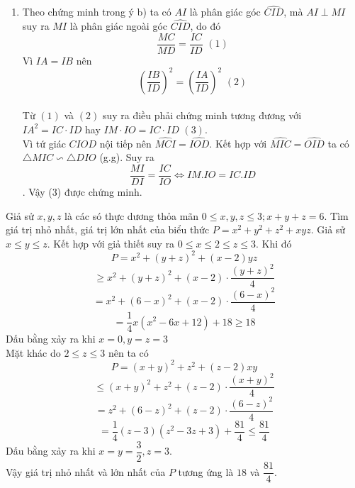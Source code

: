 \begin{ex}
{\begin{enumerate}
        \item Theo chứng minh trong ý b) ta có $AI$ là phân giác góc $\widehat{CID}$, mà $AI \perp MI$ suy ra $MI$ là phân giác ngoài góc $\widehat{CID}$, do đó $$\dfrac{MC}{MD}=\dfrac{IC}{ID} \,\, (1)$$
        Vì $IA=IB$ nên $$\left(\dfrac{IB}{ID}\right)^2=\left(\dfrac{IA}{ID}\right)^2 \,\,(2)$$\\
        Từ $(1)$ và $(2)$ suy ra điều phải chứng minh tương đương với $IA^2=IC \cdot ID$ hay $IM \cdot IO=IC \cdot ID \,\, (3)$.\\
        Vì tứ giác $CIOD$ nội tiếp nên $\widehat{MCI}=\widehat{IOD}$. Kết hợp với $\widehat{MIC}=\widehat{OID}$ ta có $\triangle MIC \backsim \triangle DIO$ (g.g). Suy ra $$\dfrac{MI}{DI}=\dfrac{IC}{IO} \Leftrightarrow IM.IO=IC.ID$$. Vậy (3) được chứng minh.
    \end{enumerate}
    }
\end{ex}

\begin{ex}%
    Giả sử $x,y,z$ là các só thực dương thỏa mãn $0 \le x,y,z \le 3; x+y+z=6$. Tìm giá trị nhỏ nhất, giá trị lớn nhất của biểu thức $P=x^2+y^2+z^2+xyz$.
\loigiai
    { Giả sử $x \leq y \leq z$. Kết hợp với giả thiết suy ra $0 \leq x \leq 2 \leq z \leq 3$. Khi đó 
    $$P=x^2+(y+z)^2+(x-2)yz$$
    $$\geq x^2+(y+z)^2+(x-2) \cdot \dfrac{(y+z)^2}{4} $$
    $$=x^2+(6-x)^2+(x-2)\cdot \dfrac{(6-x)^2}{4}$$
    $$=\dfrac{1}{4}x(x^2-6x+12)+18 \geq 18$$
    Dấu bằng xảy ra khi $x=0, y=z=3$\\
    Mặt khác do $2 \leq z \leq 3$   nên ta có $$P=(x+y)^2+z^2+(z-2)xy$$
    $$ \leq (x+y)^2+z^2+(z-2)\cdot \dfrac{(x+y)^2}{4}$$
    $$=z^2+(6-z)^2+(z-2)\cdot \dfrac{(6-z)^2}{4}$$
    $$=\dfrac{1}{4}(z-3)(z^2-3z+3)+\dfrac{81}{4} \leq \dfrac{81}{4}$$
    Dấu bằng xảy ra khi $x=y=\dfrac{3}{2}, z=3$.\\
    Vậy giá trị nhỏ nhất và lớn nhất của $P$ tương ứng là $18$ và $\dfrac{81}{4}$.
    }
\end{ex}

